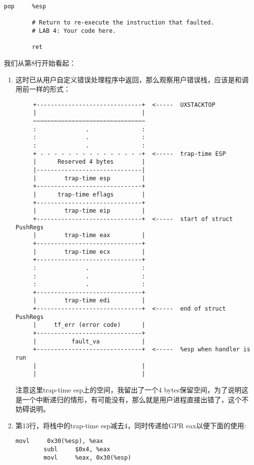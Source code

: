 \documentclass{article}
\begin{document}
\begin{CJK*}{UTF8}{gkai}
\begin{lstlisting}[style=acode, title={\scriptsize \ttfamily \bfseries lib/pfentry.S}]
        pop     %esp

        # Return to re-execute the instruction that faulted.
        # LAB 4: Your code here.

        ret
\end{lstlisting}

我们从第8行开始看起：

\begin{enumerate}
\item{这时已从用户自定义错误处理程序中返回，那么观察用户错误栈，应该是和调用前一样的形式：
{\scriptsize \bfseries
\begin{verbatim}
     +------------------------------+  <-----  UXSTACKTOP
     |                              | 
     ~~~~~~~~~~~~~~~~~~~~~~~~~~~~~~~~
     :              .               :
     :              .               :
     :              .               :
     + - - - - - - - - - - - - - - -+  <-----  trap-time ESP
     |      Reserved 4 bytes        |
     |------------------------------|  
     |        trap-time esp         | 
     +------------------------------+ 
     |      trap-time eflags        |
     +------------------------------+ 
     |        trap-time eip         |
     +------------------------------+  <-----  start of struct PushRegs
     |        trap-time eax         | 
     +------------------------------+ 
     |        trap-time ecx         | 
     +------------------------------+ 
     :              .               :
     :              .               :
     :              .               :
     +------------------------------+ 
     |        trap-time edi         | 
     +------------------------------+  <-----  end of struct PushRegs
     |     tf_err (error code)      | 
     +------------------------------+ 
     |          fault_va            | 
     +------------------------------+  <-----  %esp when handler is run
     |                              |
     |                              |
\end{verbatim}
}

注意这里trap-time esp上的空间，我留出了一个4 bytes保留空间，为了说明这是一个中断递归的情形，有可能没有，那么就是用户进程直接出错了，这个不妨碍说明。
}
\item{第13行，将栈中的trap-time esp减去4，同时传递给GPR eax以便下面的使用:

\begin{lstlisting}[style=acode, firstnumber=11, title={\scriptsize \ttfamily \bfseries lib/pfentry.S}]
        movl     0x30(%esp), %eax
        subl     $0x4, %eax
        movl     %eax, 0x30(%esp)
\end{lstlisting}
        
}
\end{enumerate}
\end{CJK*}
\end{document}
